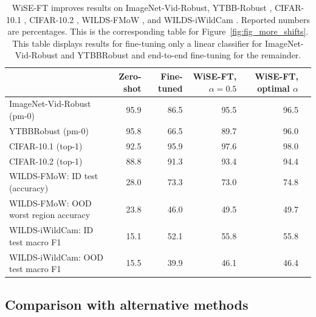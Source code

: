 \begin{table}
\setlength\tabcolsep{5pt}
\small
\begin{center}

\begin{tabular}{lrrrrr}
\toprule

{} &  Zero-shot &  Fine-tuned &  WiSE-FT, $\alpha{=}0.5$ &  WiSE-FT, optimal $\alpha$\\
\midrule
ImageNet-Vid-Robust  (pm-0)           &       95.9 &        86.5 &                  95.5 &               96.5 \\
YTBBRobust (pm-0)                   &       95.8 &        66.5 &                  89.7 &  96.0 \\
CIFAR-10.1 (top-1) &       92.5 &        95.9 &                  97.6 &               98.0 \\
CIFAR-10.2 (top-1) &       88.8 &        91.3 &                  93.4 &                   94.4 \\
WILDS-FMoW: ID test (accuracy)                &       28.0 &        73.3 &                  73.0 &           74.8 \\
WILDS-FMoW: OOD worst region accuracy       &       23.8 &        46.0 &                  49.5 &                49.7 \\
WILDS-iWildCam: ID test macro F1       &       15.1 &        52.1 &                  55.8 & 55.8 \\
WILDS-iWildCam: OOD test macro F1     &       15.5 &        39.9 &                  46.1 &                 46.4 \\
\bottomrule
\end{tabular}
\caption{\label{tab:moreshifts}
WiSE-FT improves results on ImageNet-Vid-Robust, YTBB-Robust \cite{vidrobust}, CIFAR-10.1 \cite{pmlr-v97-recht19a}, CIFAR-10.2 \cite{lu2020harder}, WILDS-FMoW \cite{wilds2021, christie2018functional}, and WILDS-iWildCam \cite{wilds2021, beery2021iwildcam}. Reported numbers are percentages. This is the corresponding table for Figure~\ref{fig:fig_more_shifts}. This table displays results for fine-tuning only a linear classifier for ImageNet-Vid-Robust and YTBBRobust and end-to-end fine-tuning for the remainder. }
\end{center}
\end{table}

\subsection{Comparison with alternative methods}
\label{sec:baselines-appendix}

